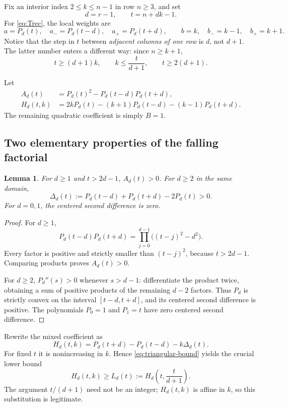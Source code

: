\documentclass[11pt,a4paper]{article}
\numberwithin{equation}{section}
\newtheorem{lemma}[lemma]{Lemma}
\theoremstyle{definition}
\theoremstyle{remark}
\begin{document}
Fix an interior index $2\le k\le n-1$ in row $n\ge3$, and set
\begin{equation}\label{eq:domain}
 d=r-1,\qquad t=n+dk-1.
\end{equation}
For \eqref{eq:Trec}, the local weights are
\[
 a=P_d(t),\quad a_-=P_d(t-d),\quad a_+=P_d(t+d),\qquad
 b=k,\quad b_-=k-1,\quad b_+=k+1.
\]
Notice that the step in $t$ between \emph{adjacent columns of one row} is
$d$, not $d+1$. The latter number enters a different way: since $n\ge k+1$,
\begin{equation}\label{eq:triangular-bound}
 t\ge(d+1)k,\qquad k\le\frac{t}{d+1},\qquad t\ge2(d+1).
\end{equation}

Let
\begin{align}
 A_d(t)&=P_d(t)^2-P_d(t-d)P_d(t+d),\label{eq:Ad}\\
 H_d(t,k)&=2kP_d(t)-(k+1)P_d(t-d)-(k-1)P_d(t+d).
                                                       \label{eq:Hd}
\end{align}
The remaining quadratic coefficient is simply $B=1$.

\subsection{Two elementary properties of the falling factorial}

\begin{lemma}\label{lem:falling}
For $d\ge1$ and $t>2d-1$, $A_d(t)>0$. For $d\ge2$ in the same domain,
\[
 \Delta_d(t):=P_d(t-d)+P_d(t+d)-2P_d(t)>0.
\]
For $d=0,1$, the centered second difference is zero.
\end{lemma}
\begin{proof}
For $d\ge1$,
\[
 P_d(t-d)P_d(t+d)=\prod_{j=0}^{d-1}\bigl((t-j)^2-d^2\bigr).
\]
Every factor is positive and strictly smaller than $(t-j)^2$, because
$t>2d-1$. Comparing products proves $A_d(t)>0$.

For $d\ge2$, $P_d''(s)>0$ whenever $s>d-1$: differentiate the product
twice, obtaining a sum of positive products of the remaining $d-2$
factors. Thus $P_d$ is strictly convex on the interval $[t-d,t+d]$,
and its centered second difference is positive. The polynomials
$P_0=1$ and $P_1=t$ have zero centered second difference.
\end{proof}

Rewrite the mixed coefficient as
\begin{equation}\label{eq:Hdecreasing}
 H_d(t,k)=P_d(t+d)-P_d(t-d)-k\Delta_d(t).
\end{equation}
For fixed $t$ it is nonincreasing in $k$. Hence \eqref{eq:triangular-bound}
yields the crucial lower bound
\begin{equation}\label{eq:Lbound}
 H_d(t,k)\ge L_d(t):=H_d\!\left(t,\frac{t}{d+1}\right).
\end{equation}
The argument $t/(d+1)$ need not be an integer; $H_d(t,k)$ is affine in $k$,
so this substitution is legitimate.
\end{document}
